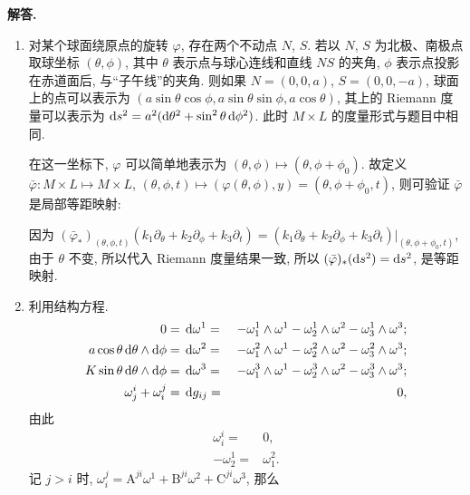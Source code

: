 \documentclass{ctexart}
\newenvironment{solution}{\par\noindent\textbf{解答. }}{\par}
\begin{document}
\begin{solution}
    \begin{enumerate}[label = (\roman*)]
        \item 对某个球面绕原点的旋转 $\varphi$, 存在两个不动点 $N$, $S$. 若以 $N$, $S$ 为北极、南极点取球坐标 $(\theta, \phi)$, 其中 $\theta$ 表示点与球心连线和直线 $NS$ 的夹角, $\phi$ 表示点投影在赤道面后, 与``子午线''的夹角. 则如果 $N = (0, 0, a)$, $S = (0, 0, -a)$, 球面上的点可以表示为 $(a\sin \theta \cos \phi, a\sin \theta \sin \phi, a\cos \theta)$, 其上的 Riemann 度量可以表示为 $\mathop{}\!\mathrm{d} s^2 = a^2 (\mathop{}\!\mathrm{d} \theta^2 + \sin^2 \theta \mathop{}\!\mathrm{d} \phi^2) $. 此时 $M \times L$ 的度量形式与题目中相同.
        
        在这一坐标下, $\varphi$ 可以简单地表示为 $(\theta, \phi) \mapsto (\theta, \phi + \phi_0)$. 故定义 $\bar{\varphi} \colon M \times L \mapsto M \times L$, $(\theta, \phi, t) \mapsto (\varphi(\theta, \phi), y) = (\theta, \phi + \phi_0, t)$, 则可验证 $\bar{\varphi}$ 是局部等距映射: 
        
        因为 $(\bar{\varphi}_{\ast})_{(\theta, \phi, t)}(k_1 \partial_{\theta} + k_2 \partial_{\phi} + k_3 \partial_t) = (k_1 \partial_{\theta} + k_2 \partial_{\phi} + k_3 \partial_t)|_{(\theta, \phi + \phi_0, t)}$, 由于 $\theta$ 不变, 所以代入 Riemann 度量结果一致, 所以 $(\bar{\varphi})_{\ast}(\mathop{}\!\mathrm{d} s^2) = \mathop{}\!\mathrm{d} s^2$, 是等距映射.  
        \item 利用结构方程.
        \[
            \begin{aligned}
                0 ={}& \dif \omega^1 ={}& -\omega^1_1 \wedge \omega^1 - \omega^1_2 \wedge \omega^2 - \omega^1_3 \wedge \omega^3; \\
                a \cos \theta \dif \theta \wedge \dif \phi ={}& \dif \omega^2 ={}& -\omega^2_1 \wedge \omega^1 - \omega^2_2 \wedge \omega^2 - \omega^2_3 \wedge \omega^3; \\
                K \sin \theta \dif \theta \wedge \dif \phi ={}& \dif \omega^3 ={}& -\omega^3_1 \wedge \omega^1 - \omega^3_2 \wedge \omega^2 - \omega^3_3 \wedge \omega^3; \\
                \omega^{i}_{j} + \omega^{j}_{i} ={}& \dif g_{ij} ={}& 0,
            \end{aligned}
        \]
        由此
        \[
            \begin{aligned}
                \omega^i_i ={}& 0, \\
                -\omega^1_2 ={}& \omega^2_1. 
            \end{aligned}
        \]
        \newcommand{\A}{\mathrm{A}}
        \newcommand{\B}{\mathrm{B}}
        \newcommand{\C}{\mathrm{C}}
        记 $j > i$ 时, $\omega^{j}_{i} = \A^{ji}\omega^1 + \B^{ji}\omega^2 + \C^{ji}\omega^3$, 那么


\end{enumerate}
\end{solution}
\end{document}
